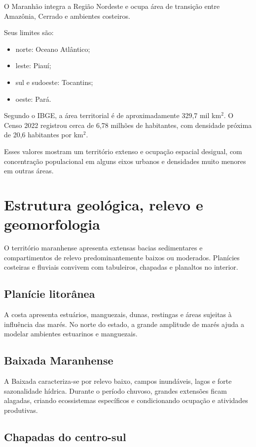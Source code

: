 O Maranhão integra a Região Nordeste e ocupa área de transição entre Amazônia, Cerrado e ambientes costeiros.

Seus limites são:
\begin{itemize}
\item norte: Oceano Atlântico;
\item leste: Piauí;
\item sul e sudoeste: Tocantins;
\item oeste: Pará.
\end{itemize}

Segundo o IBGE, a área territorial é de aproximadamente 329,7 mil km$^2$. O Censo 2022 registrou cerca de 6,78 milhões de habitantes, com densidade próxima de 20,6 habitantes por km$^2$.

Esses valores mostram um território extenso e ocupação espacial desigual, com concentração populacional em alguns eixos urbanos e densidades muito menores em outras áreas.

\section{Estrutura geológica, relevo e geomorfologia}

O território maranhense apresenta extensas bacias sedimentares e compartimentos de relevo predominantemente baixos ou moderados. Planícies costeiras e fluviais convivem com tabuleiros, chapadas e planaltos no interior.

\subsection{Planície litorânea}

A costa apresenta estuários, manguezais, dunas, restingas e áreas sujeitas à influência das marés. No norte do estado, a grande amplitude de marés ajuda a modelar ambientes estuarinos e manguezais.

\subsection{Baixada Maranhense}

A Baixada caracteriza-se por relevo baixo, campos inundáveis, lagos e forte sazonalidade hídrica. Durante o período chuvoso, grandes extensões ficam alagadas, criando ecossistemas específicos e condicionando ocupação e atividades produtivas.

\subsection{Chapadas do centro-sul}

